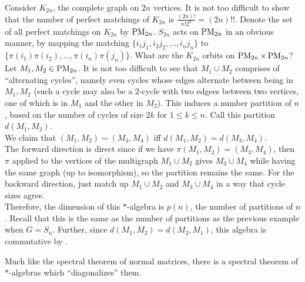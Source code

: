 	\begin{fex}
		Consider $K_{2n}$, the complete graph on $2n$ vertices. It is not too difficult to show that the number of perfect matchings of $K_{2n}$ is $\frac{(2n)!}{n!2^n} = (2n)!!$. Denote the set of all perfect matchings on $K_{2n}$ by $\operatorname{PM}_{2n}$. $S_{2n}$ acts on $\operatorname{PM}_{2n}$ in an obvious manner, by mapping the matching $\{i_1j_1,i_2j_2,\ldots,i_nj_n\}$ to $\{\pi(i_1)\pi(i_2),\ldots,\pi(i_n)\pi(j_n)\}$. What are the $K_{2n}$ orbits on $\operatorname{PM}_{2n} \times \operatorname{PM}_{2n}$?\\
		Let $M_1,M_2 \in \operatorname{PM}_{2n}$. It is not too difficult to see that $M_1 \cup M_2$ comprises of ``alternating cycles'', namely even cycles whose edges alternate between being in $M_1,M_2$ (such a cycle may also be a $2$-cycle with two edgees between two vertices, one of which is in $M_1$ and the other in $M_2$).  This induces a number partition of $n$, based on the number of cycles of size $2k$ for $1 \le k \le n$. Call this partition $d(M_1,M_2)$.\\
		
		We claim that $(M_1,M_2) \sim (M_3,M_4)$ iff $d(M_1,M_2) = d(M_3,M_4)$.\\
		The forward direction is direct since if we have $\pi (M_1,M_2) = (M_3,M_4)$, then $\pi$ applied to the vertices of the multigraph $M_1 \cup M_2$ gives $M_3 \cup M_4$ while having the same graph (up to isomorphism), so the partition remains the same. For the backward direction, just match up $M_1 \cup M_2$ and $M_3 \cup M_4$ in a way that cycle sizes agree.\\

		Therefore, the dimension of this $*$-algebra is $p(n)$, the number of partitions of $n$. Recall that this is the same as the number of partitions as the previous example when $G = S_n$. Further, since $d(M_1,M_2) = d(M_2,M_1)$, this algebra is commutative by .
	\end{fex}

	Much like the spectral theorem of normal matrices, there is a spectral theorem of $*$-algebras which ``diagonalizes'' them.

